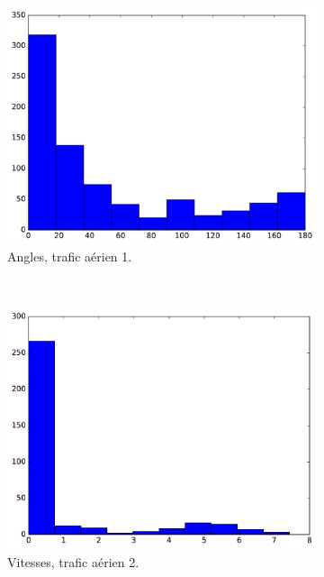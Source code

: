 \begin{figure}
\begin{subfigure}[t]{\subImgWclicks}
			\includegraphics[width=\textwidth]{figures/ch3/mhA_angle}
			\caption{Angles, trafic aérien 1.}
			\label{fig:mhA_angle}
		\end{subfigure}
		~
		\begin{subfigure}[t]{\subImgWclicks}
			\centering
			\includegraphics[width=\textwidth]{figures/ch3/germanwingsA_speed}
			\caption{Vitesses, trafic aérien 2.}
			\label{fig:germanwingsA_speed}
		\end{subfigure}
		~
		\begin{subfigure}[t]{\subImgWclicks}
			\centering

\end{subfigure}
\end{figure}
